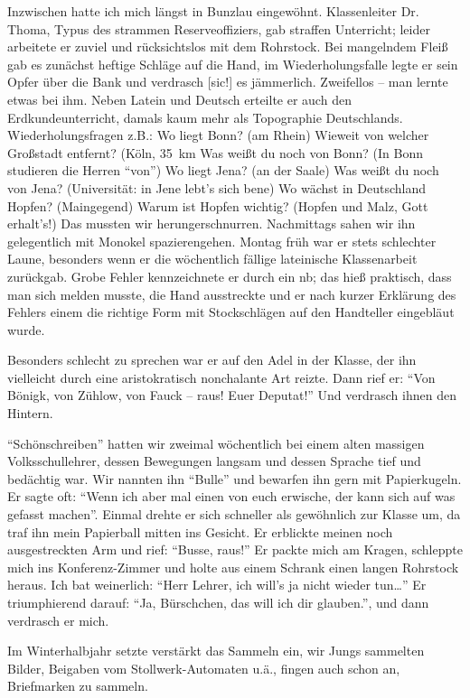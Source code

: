 Inzwischen hatte ich mich längst in Bunzlau eingewöhnt. Klassenleiter Dr. Thoma, Typus des strammen Reserveoffiziers, gab straffen Unterricht; leider arbeitete er zuviel und rücksichtslos mit dem Rohrstock. Bei mangelndem Fleiß gab es zunächst heftige Schläge auf die Hand, im Wiederholungsfalle legte er sein Opfer über die Bank und verdrasch [sic!] es jämmerlich. Zweifellos -- man lernte etwas bei ihm. Neben Latein und Deutsch erteilte er auch den Erdkundeunterricht, damals kaum mehr als Topographie Deutschlands. Wiederholungsfragen z.B.: Wo liegt Bonn? (am Rhein) Wieweit von welcher Großstadt entfernt? (Köln, 35~km Was weißt du noch von Bonn? (In Bonn studieren die Herren \enquote{von}) Wo liegt Jena? (an der Saale) Was weißt du noch von Jena? (Universität: in Jene lebt's sich bene) Wo wächst in Deutschland Hopfen? (Maingegend) Warum ist Hopfen wichtig? (Hopfen und Malz, Gott erhalt's!) Das mussten wir herungerschnurren. Nachmittags sahen wir ihn gelegentlich mit Monokel spazierengehen. Montag früh war er stets schlechter Laune, besonders wenn er die wöchentlich fällige lateinische Klassenarbeit zurückgab. Grobe Fehler kennzeichnete er durch ein nb; das hieß praktisch, dass man sich melden musste, die Hand ausstreckte und er nach kurzer Erklärung des Fehlers einem die richtige Form mit Stockschlägen auf den Handteller eingebläut wurde.

Besonders schlecht zu sprechen war er auf den Adel in der Klasse, der ihn vielleicht durch eine aristokratisch nonchalante Art reizte. Dann rief er: \enquote{Von Bönigk, von Zühlow, von Fauck -- raus! Euer Deputat!} Und verdrasch ihnen den Hintern.

\enquote{Schönschreiben} hatten wir zweimal wöchentlich bei einem alten massigen Volksschullehrer, dessen Bewegungen langsam und dessen Sprache tief und bedächtig war. Wir nannten ihn \enquote{Bulle} und bewarfen ihn gern mit Papierkugeln. Er sagte oft: \enquote{Wenn ich aber mal einen von euch erwische, der kann sich auf was gefasst machen}. Einmal drehte er sich schneller als gewöhnlich zur Klasse um, da traf ihn mein Papierball mitten ins Gesicht. Er erblickte meinen noch ausgestreckten Arm und rief: \enquote{Busse, raus!} Er packte mich am Kragen, schleppte mich ins Konferenz-Zimmer und holte aus einem Schrank einen langen Rohrstock heraus. Ich bat weinerlich: \enquote{Herr Lehrer, ich will's ja nicht wieder tun\dots} Er triumphierend darauf: \enquote{Ja, Bürschchen, das will ich dir glauben.}, und dann verdrasch er mich.

Im Winterhalbjahr setzte verstärkt das Sammeln ein, wir Jungs sammelten Bilder, Beigaben vom Stollwerk-Automaten u.ä., fingen auch schon an, Briefmarken zu sammeln.

